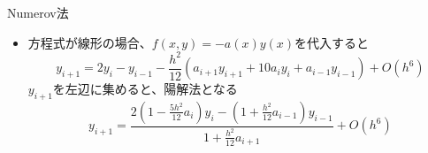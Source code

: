 \begin{frame}[t,fragile]{Numerov法}
  \begin{itemize}
  \item 方程式が線形の場合、$f(x,y) = -a(x) y(x)$を代入すると
    \[
    y_{i+1} = 2y_i - y_{i-1} - \frac{h^2}{12} (a_{i+1}y_{i+1} + 10a_{i}y_{i} + a_{i-1}y_{i-1}) + O(h^6)
    \]
  $y_{i+1}$を左辺に集めると、陽解法となる
    \[
    y_{i+1} = \frac{2 (1-\frac{5h^2}{12} a_i)y_i - (1 + \frac{h^2}{12} a_{i-1}) y_{i-1}}{1 + \frac{h^2}{12} a_{i+1}} + O(h^6)
    \]
  \end{itemize}
\end{frame}

